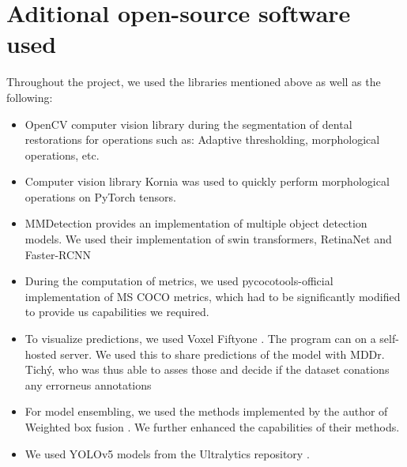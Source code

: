 \section{Aditional open-source software used}
Throughout the project, we used the libraries mentioned above as well as the following:
\begin{itemize}
    \item OpenCV \cite{opencv_library}  computer vision library during the segmentation of dental restorations for operations such as: Adaptive thresholding, morphological operations, etc.
    \item Computer vision library Kornia \cite{eriba2019kornia} was used to quickly perform morphological operations on PyTorch tensors.
    \item MMDetection \cite{mmdetection} provides an implementation of multiple object detection models. We used their implementation of swin transformers, RetinaNet and Faster-RCNN
    \item During the computation of metrics, we used pycocotools-official \cite{pycocotools} implementation of MS COCO metrics, which had to be significantly modified to provide us capabilities we required.
    \item To visualize predictions, we used Voxel Fiftyone \cite{moorefiftyone}. The program can on a self-hosted server. We used this to share predictions of the model with MDDr. Tichý, who was thus able to asses those and decide if the dataset conations any errorneus annotations
    \item For model ensembling, we used the methods implemented by the author of Weighted box fusion \cite{Solovyev2019}. We further enhanced the capabilities of their methods.
    \item We used YOLOv5 models from the Ultralytics repository \cite{glennjocher2020}.
\end{itemize}